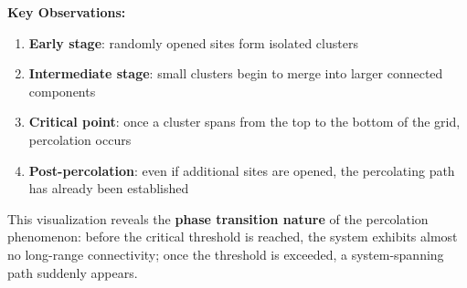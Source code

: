 \documentclass[11pt]{article}
\providecommand{\tightlist}{%
      \setlength{\itemsep}{0pt}\setlength{\parskip}{0pt}}
\begin{document}
\textbf{Key Observations:}

\begin{enumerate}
\def\labelenumi{\arabic{enumi}.}
\tightlist
\item
  \textbf{Early stage}: randomly opened sites form isolated clusters\\
\item
  \textbf{Intermediate stage}: small clusters begin to merge into larger
  connected components\\
\item
  \textbf{Critical point}: once a cluster spans from the top to the
  bottom of the grid, percolation occurs\\
\item
  \textbf{Post-percolation}: even if additional sites are opened, the
  percolating path has already been established
\end{enumerate}

This visualization reveals the \textbf{phase transition nature} of the
percolation phenomenon: before the critical threshold is reached, the
system exhibits almost no long-range connectivity; once the threshold is
exceeded, a system-spanning path suddenly appears.
\end{document}
